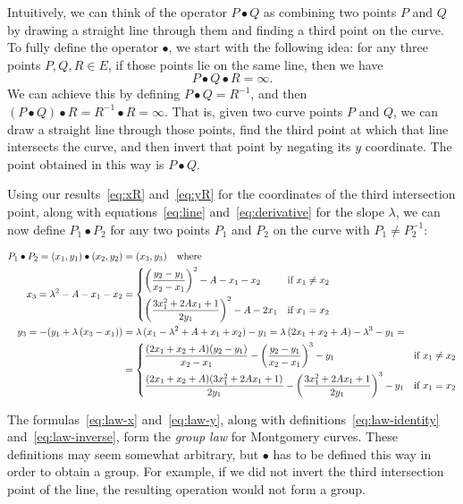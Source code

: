 \documentclass[manuscript]{acmart}
\begin{document}
Intuitively, we can think of the operator $P \bullet Q$ as combining two points $P$ and $Q$ by drawing a straight line through them and finding a third point on the curve.
To fully define the operator $\bullet$, we start with the following idea: for any three points $P, Q, R \in E$, if those points lie on the same line, then we have
\begin{equation}
P \bullet Q \bullet R = \infty.
\end{equation}
We can achieve this by defining $P \bullet Q = R^{-1}$, and then $(P \bullet Q) \bullet R = R^{-1} \bullet R = \infty$.
That is, given two curve points $P$ and $Q$, we can draw a straight line through those points, find the third point at which that line intersects the curve, and then invert that point by negating its $y$ coordinate.
The point obtained in this way is $P \bullet Q$.

Using our results~\eqref{eq:xR} and~\eqref{eq:yR} for the coordinates of the third intersection point, along with equations~\eqref{eq:line} and~\eqref{eq:derivative} for the slope $\lambda$, we can now define $P_1 \bullet P_2$ for any two points $P_1$ and $P_2$ on the curve with $P_1 \neq P_2^{-1}$:

\begin{align}
P_1 \bullet P_2 = (x_1, y_1) \bullet (x_2, y_2) &= (x_3, y_3) \quad\text{where}\nonumber\\
x_3 = \lambda^2 - A - x_1 - x_2 &= \begin{dcases}
\left(\frac{y_2 - y_1}{x_2 - x_1}\right)^2 - A - x_1 - x_2 & \text{if } x_1 \neq x_2 \\
\left(\frac{3x_1^2 + 2Ax_1 + 1}{2y_1}\right)^2 - A - 2x_1 & \text{if } x_1 = x_2
\end{dcases}\label{eq:law-x}\\
y_3 = -(y_1 + \lambda\,(x_3 - x_1)) &= \lambda\,(x_1 - \lambda^2 + A + x_1 + x_2) - y_1 =
\lambda\,(2x_1 + x_2 + A) - \lambda^3 - y_1 =\label{eq:law-y}\\
&= \begin{dcases}
\frac{(2x_1 + x_2 + A) (y_2 - y_1)}{x_2 - x_1} - \left(\frac{y_2 - y_1}{x_2 - x_1}\right)^3 - y_1 & \text{if } x_1 \neq x_2 \\
\frac{(2x_1 + x_2 + A) (3x_1^2 + 2Ax_1 + 1)}{2y_1} - \left(\frac{3x_1^2 + 2Ax_1 + 1}{2y_1}\right)^3 - y_1 & \text{if } x_1 = x_2
\end{dcases}\nonumber
\end{align}

The formulas~\eqref{eq:law-x} and~\eqref{eq:law-y}, along with definitions~\eqref{eq:law-identity} and~\eqref{eq:law-inverse}, form the \emph{group law} for Montgomery curves.
These definitions may seem somewhat arbitrary, but $\bullet$ has to be defined this way in order to obtain a group.
For example, if we did not invert the third intersection point of the line, the resulting operation would not form a group.
\end{document}
